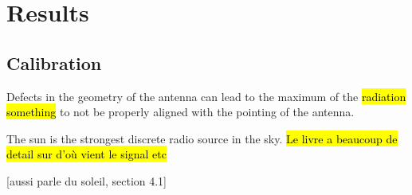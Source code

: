 \section{Results}
\subsection{Calibration}
Defects in the geometry of the antenna can lead to the maximum of the \hl{radiation something} to not be properly aligned with the pointing of the antenna.


The sun is the strongest discrete radio source in the sky\cite{burke_introduction_2013}. \hl{Le livre a beaucoup de detail sur d'où vient le signal etc}

[aussi \cite{lauterbach_radio_2022} parle du soleil, section 4.1]